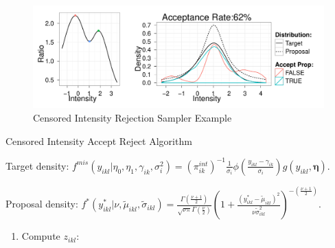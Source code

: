 \begin{figure}
\includegraphics[width=1\textwidth]{figures/proteomics/figure_ycen_rejection_sampler.pdf}
\caption{Censored Intensity Rejection Sampler Example\label{proteomics:fig:Censored-Intensity-Rejection-Sampler-Outline-TEXT}}
\end{figure}


\begin{algorithm}
\caption{Censored Intensity Accept Reject Algorithm\label{proteomics:alg:Censored-Intensity-Accept-Reject-Algorithm-TEXT}}


$ $Target density: $f^{mis}(y_{ikl}\vert\eta_{0},\eta_{1},\gamma_{ik},\sigma_{i}^{2})=(\pi_{ik}^{int})^{-1} \frac{1}{\sigma_{i}}\phi\left(\frac{y_{ikl}-\gamma_{ik}}{\sigma_{i}}\right) g(y_{ikl}, \bm \eta)$.

Proposal density: $f^*(y_{ikl}^{*}\vert\nu,\tilde{\mu}_{ikl},\tilde{\sigma}_{ikl})=\frac{\Gamma\left(\frac{\nu+1}{2}\right)}{\sqrt{\nu\pi}\Gamma\left(\frac{\nu}{2}\right)}\left(1+\frac{(y_{ikl}^{*}-\tilde{\mu}_{ikl})^{2}}{\nu\tilde{\sigma}_{ikl}^{2}}\right)^{-\left(\frac{\nu+1}{2}\right)}$.
\begin{enumerate}
\item Compute $z_{ikl}$:


\end{enumerate}
\end{algorithm}
